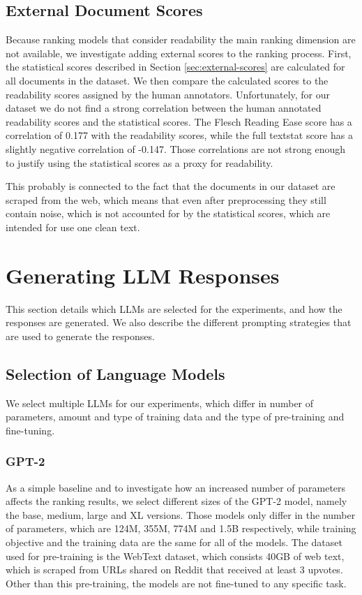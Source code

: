\subsection{External Document Scores}
Because ranking models that consider readability the main ranking dimension are not available, we investigate adding external scores to the ranking process.
First, the statistical scores described in Section \ref{sec:external-scores} are calculated for all documents in the dataset.
We then compare the calculated scores to the readability scores assigned by the human annotators.
Unfortunately, for our dataset we do not find a strong correlation between the human annotated readability scores and the statistical scores.
The Flesch Reading Ease score has a correlation of 0.177 with the readability scores, while the full textstat score has a slightly negative correlation of -0.147.
Those correlations are not strong enough to justify using the statistical scores as a proxy for readability.

This probably is connected to the fact that the documents in our dataset are scraped from the web, which means that even after preprocessing they still contain noise, which is not accounted for by the statistical scores, which are intended for use one clean text.
\section{Generating LLM Responses}
This section details which LLMs are selected for the experiments, and how the responses are generated.
We also describe the different prompting strategies that are used to generate the responses.

\subsection{Selection of Language Models}
We select multiple LLMs for our experiments, which differ in number of parameters, amount and type of training data and the type of pre-training and fine-tuning.

\subsubsection{GPT-2}
As a simple baseline and to investigate how an increased number of parameters affects the ranking results, we select different sizes of the GPT-2 model, namely the base, medium, large and XL versions.
Those models only differ in the number of parameters, which are 124M, 355M, 774M and 1.5B respectively, while training objective and the training data are the same for all of the models.
The dataset used for pre-training is the WebText dataset, which consists 40GB of web text, which is scraped from URLs shared on Reddit that received at least 3 upvotes.
Other than this pre-training, the models are not fine-tuned to any specific task.

